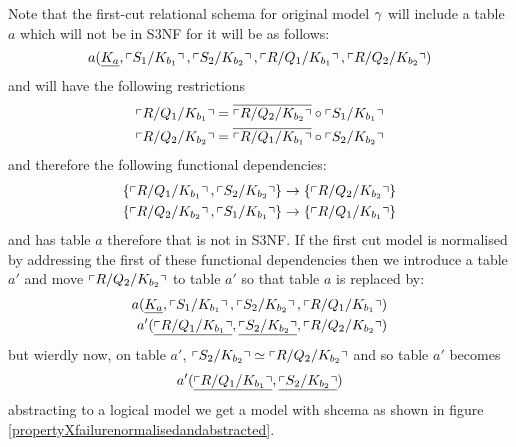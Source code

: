 Note that the first-cut relational schema for original model $\gmodel$ will include a table $a$ which will not be in S3NF for it
will be as follows:
\begin{equation}
a(\underline{K_a},\qq{S_1/K_{b_1}},\qq{S_2/K_{b_2}}, \qq{R/Q_1/K_{b_1}}, \qq{R/Q_2/K_{b_2}})
\end{equation}
and will have the following restrictions
\begin{align}
\qq{R/Q_1/K_{b_1}} = \overline{\qq{R/Q_2/K_{b_2}}} \circ \qq{S_1/K_{b_1}} \\
\qq{R/Q_2/K_{b_2}} = \overline{\qq{R/Q_1/K_{b_1}}} \circ \qq{S_2/K_{b_2}}
\end{align}
and therefore the following functional dependencies:
\begin{align} 
\fd{\qq{R/Q_1/K_{b_1}},\qq{S_2/K_{b_2}}}{\qq{R/Q_2/K_{b_2}}} \\
\fd{\qq{R/Q_2/K_{b_2}},\qq{S_1/K_{b_1}}}{\qq{R/Q_1/K_{b_1}}}
\end{align}
and has table $a$ therefore that is not in S3NF.
If the first cut model is normalised by addressing the first of these functional dependencies then we 
introduce a table $a'$ and move $\qq{R/Q_2/K_{b_2}}$ to table $a'$ so that table $a$ is replaced by:
\begin{align}
a(\underline{K_a},\qq{S_1/K_{b_1}},\qq{S_2/K_{b_2}}, \qq{R/Q_1/K_{b_1}}) \\
a'(\underline{\qq{R/Q_1/K_{b_1}}},\underline{\qq{S_2/K_{b_2}}}, \qq{R/Q_2/K_{b_2}} )
\end{align}
but wierdly now, on table $a'$,  $\qq{S_2/K_{b_2}} \simeq \qq{R/Q_2/K_{b_2}}$ and so table $a'$ becomes
\begin{align}
a'(\underline{\qq{R/Q_1/K_{b_1}}},\underline{\qq{S_2/K_{b_2}}} )
\end{align}
abstracting to a logical model we get a model with shcema as shown in figure \ref{propertyXfailurenormalisedandabstracted}.

